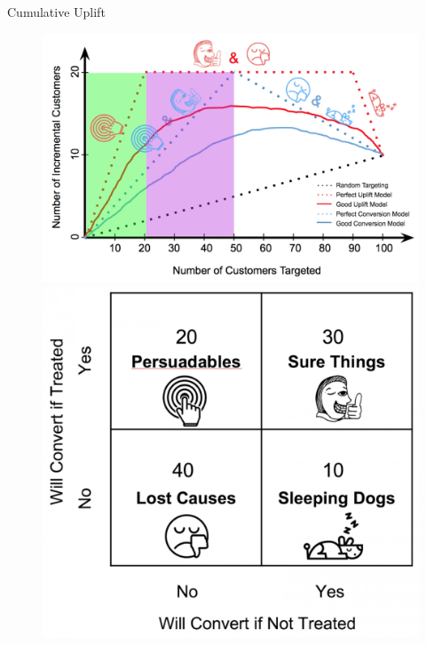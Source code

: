 \documentclass[20pt]{beamer}
\begin{document}
\begin{frame}{Cumulative Uplift}
  \begin{figure}[!tbp]
    \centering
    \begin{minipage}[b]{0.6\textwidth}
      \includegraphics[width=\textwidth]{./images/cumulative_uplift.png}
    \end{minipage}
    \hfill
    \begin{minipage}[b]{0.35\textwidth}
      \includegraphics[width=\textwidth]{./images/customer_segments.png}
    \end{minipage}
  \end{figure}


\end{frame}
\end{document}

